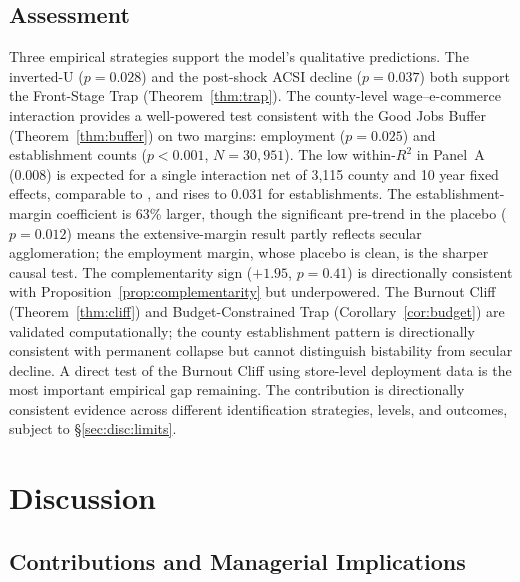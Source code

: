 \documentclass[msom,dblanonrev]{informs4}
\begin{document}
\subsection{Assessment}\label{sec:emp:assessment}

Three empirical strategies support the model's qualitative predictions. The inverted-U ($p = 0.028$) and the post-shock ACSI decline ($p = 0.037$) both support the Front-Stage Trap (Theorem~\ref{thm:trap}). The county-level wage--e-commerce interaction provides a well-powered test consistent with the Good Jobs Buffer (Theorem~\ref{thm:buffer}) on two margins: employment ($p = 0.025$) and establishment counts ($p < 0.001$, $N = 30{,}951$). The low within-$R^2$ in Panel~A (0.008) is expected for a single interaction net of 3{,}115 county and 10 year fixed effects, comparable to \citet{chetty2009salience}, and rises to 0.031 for establishments. The establishment-margin coefficient is 63\% larger, though the significant pre-trend in the placebo ($p = 0.012$) means the extensive-margin result partly reflects secular agglomeration; the employment margin, whose placebo is clean, is the sharper causal test. The complementarity sign ($+1.95$, $p = 0.41$) is directionally consistent with Proposition~\ref{prop:complementarity} but underpowered. The Burnout Cliff (Theorem~\ref{thm:cliff}) and Budget-Constrained Trap (Corollary~\ref{cor:budget}) are validated computationally; the county establishment pattern is directionally consistent with permanent collapse but cannot distinguish bistability from secular decline. A direct test of the Burnout Cliff using store-level deployment data is the most important empirical gap remaining. The contribution is directionally consistent evidence across different identification strategies, levels, and outcomes, subject to \S\ref{sec:disc:limits}.


\section{Discussion}\label{sec:discussion}

\subsection{Contributions and Managerial Implications}\label{sec:disc:theory}
\end{document}

